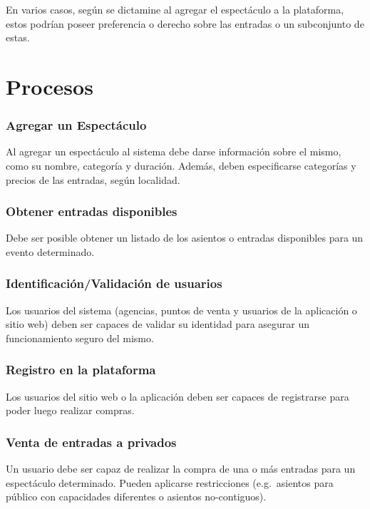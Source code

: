 En varios casos, según se dictamine al agregar el espectáculo a la plataforma,
estos podrían poseer preferencia o derecho sobre las entradas o un subconjunto
de estas.

\section{Procesos}

\subsubsection{Agregar un Espectáculo}

Al agregar un espectáculo al sistema debe darse información sobre el mismo, como
su nombre, categoría y duración.  Además, deben especificarse categorías y
precios de las entradas, según localidad.

\subsubsection{Obtener entradas disponibles}

Debe ser posible obtener un listado de los asientos o entradas disponibles para
un evento determinado.

\subsubsection{Identificación/Validación de usuarios}

Los usuarios del sistema (agencias, puntos de venta y usuarios de la aplicación o sitio web)
deben ser capaces de validar su identidad para asegurar un
funcionamiento seguro del mismo.

\subsubsection{Registro en la plataforma}

Los usuarios del sitio web o la aplicación deben ser capaces de registrarse
para poder luego realizar compras.

\subsubsection{Venta de entradas a privados}

Un usuario debe ser capaz de realizar la compra de una o más
entradas para un espectáculo determinado. Pueden aplicarse restricciones
(e.g.\ asientos para público con capacidades diferentes o asientos no-contiguos).

